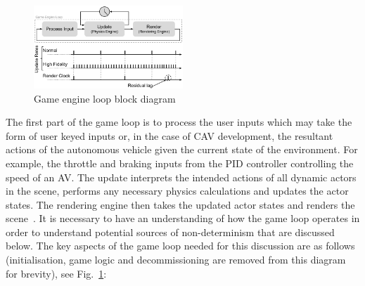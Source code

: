 \begin{figure}[h]
\centering
\includegraphics[width=0.5\textwidth]{Other/Figures/GameEngineLoop.pdf}
\caption{Game engine loop block diagram~\cite{GameProgPatternsBook}}
\label{GameEngineLoopDiagram}
\end{figure}
The first part of the game loop is to process the user inputs which may take the form of user keyed inputs or, in the case of CAV development, the resultant actions of the autonomous vehicle given the current state of the environment. For example, the throttle and braking inputs from the PID controller controlling the speed of an AV. %
%
The update interprets the intended actions of all dynamic actors in the scene, performs any necessary physics calculations and updates the actor states. %
%
The rendering engine then takes the updated actor states and renders the scene~\cite{GameProgPatternsBook}. %
% 
% 
It is necessary to have an understanding of how the game loop operates in order to understand potential sources of non-determinism that are discussed below. 
% 
The key aspects of the game loop needed for this discussion are as follows (initialisation, game logic and decommissioning are removed from this diagram for brevity), see Fig.~\ref{GameEngineLoopDiagram}: 

